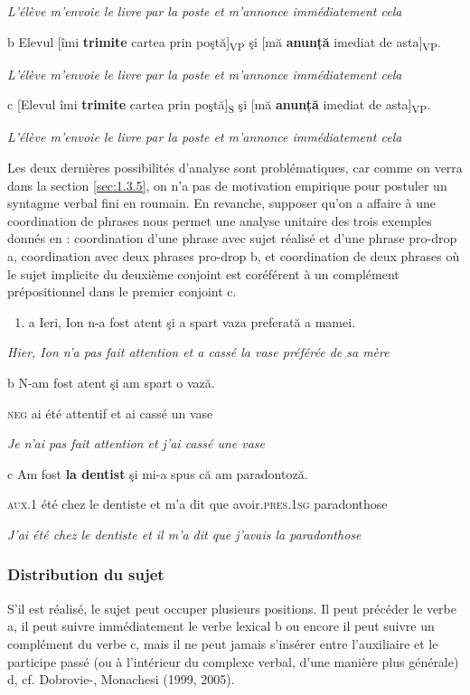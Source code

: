 \textit{L'élève m'envoie le livre par la poste et m'annonce immédiatement cela}  

  b  Elevul [îmi \textbf{trimite} cartea prin poştă]\textsubscript{VP} şi [mă \textbf{anunță} imediat de asta]\textsubscript{VP}.  

\textit{    L'élève m'envoie le livre par la poste et m'annonce immédiatement cela}  

  c  [Elevul îmi \textbf{trimite} cartea prin poştă]\textsubscript{S} şi [mă \textbf{anunță} imediat de asta]\textsubscript{VP}.  

{\itshape
    L'élève m'envoie le livre par la poste et m'annonce immédiatement cela}

Les deux dernières possibilités d'analyse sont problématiques, car comme on verra dans la section \ref{sec:1.3.5}, on n'a pas de motivation empirique pour postuler un syntagme verbal fini en roumain. En revanche, supposer qu'on a affaire à une coordination de phrases nous permet une analyse unitaire des trois exemples donnés en  : coordination d'une phrase avec sujet réalisé et d'une phrase pro-drop a, coordination avec deux phrases pro-drop b, et coordination de deux phrases où le sujet implicite du deuxième conjoint est coréférent à un complément prépositionnel dans le premier conjoint c.


\begin{enumerate}
\item \label{bkm:Ref277687288}a  Ieri, Ion n-a fost atent şi a spart vaza preferată a mamei.


\end{enumerate}
    \textit{Hier, Ion n'a pas fait attention et a cassé la vase préférée de sa mère}

  b  N-am fost atent şi am spart o vază.

\textsc{    neg} ai été attentif et ai cassé un vase

\textit{Je n'ai pas fait attention et j'ai cassé une vase}  

  c  Am fost \textbf{la dentist} şi mi-a spus că am paradontoză.

\textsc{aux.1} été chez le dentiste et m'a dit que avoir.\textsc{pres.1sg} paradonthose

\textit{J'ai été chez le dentiste et il m'a dit que j'avais la paradonthose} 

\subsubsection{Distribution du sujet}
\label{bkm:Ref299309324}S'il est réalisé, le sujet peut occuper plusieurs positions. Il peut précéder le verbe a, il peut suivre immédiatement le verbe lexical b ou encore il peut suivre un complément du verbe c, mais il ne peut jamais s'insérer entre l'auxiliaire et le participe passé (ou à l'intérieur du complexe verbal, d'une manière plus générale) d, cf. Dobrovie-\citet{Sorin1994}, Monachesi (1999, 2005).


